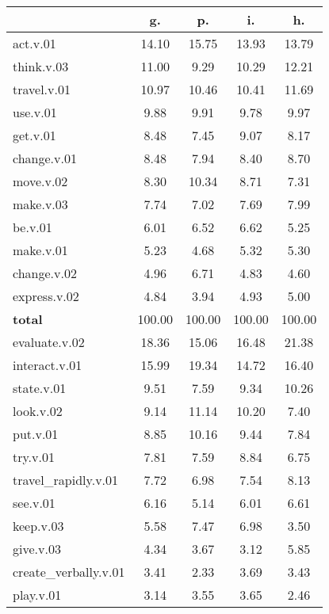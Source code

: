 \begin{table}[h!]
\begin{center}
\begin{tabular}{| l || c | c | c | c |}\hline
 & {\bf g.} & {\bf p.} & {\bf i.} & {\bf h.} \\\hline\hline
act.v.01 & 14.10  & 15.75  & 13.93  & 13.79 \\\hline
think.v.03 & 11.00  & 9.29  & 10.29  & 12.21 \\\hline
travel.v.01 & 10.97  & 10.46  & 10.41  & 11.69 \\\hline
use.v.01 & 9.88  & 9.91  & 9.78  & 9.97 \\\hline
get.v.01 & 8.48  & 7.45  & 9.07  & 8.17 \\\hline
change.v.01 & 8.48  & 7.94  & 8.40  & 8.70 \\\hline
move.v.02 & 8.30  & 10.34  & 8.71  & 7.31 \\\hline
make.v.03 & 7.74  & 7.02  & 7.69  & 7.99 \\\hline
be.v.01 & 6.01  & 6.52  & 6.62  & 5.25 \\\hline
make.v.01 & 5.23  & 4.68  & 5.32  & 5.30 \\\hline
change.v.02 & 4.96  & 6.71  & 4.83  & 4.60 \\\hline
express.v.02 & 4.84  & 3.94  & 4.93  & 5.00 \\\hline\hline
{{\bf total}} & 100.00  & 100.00  & 100.00  & 100.00 \\\hline\hline\hline
evaluate.v.02 & 18.36  & 15.06  & 16.48  & 21.38 \\\hline
interact.v.01 & 15.99  & 19.34  & 14.72  & 16.40 \\\hline
state.v.01 & 9.51  & 7.59  & 9.34  & 10.26 \\\hline
look.v.02 & 9.14  & 11.14  & 10.20  & 7.40 \\\hline
put.v.01 & 8.85  & 10.16  & 9.44  & 7.84 \\\hline
try.v.01 & 7.81  & 7.59  & 8.84  & 6.75 \\\hline
travel\_rapidly.v.01 & 7.72  & 6.98  & 7.54  & 8.13 \\\hline
see.v.01 & 6.16  & 5.14  & 6.01  & 6.61 \\\hline
keep.v.03 & 5.58  & 7.47  & 6.98  & 3.50 \\\hline
give.v.03 & 4.34  & 3.67  & 3.12  & 5.85 \\\hline
create\_verbally.v.01 & 3.41  & 2.33  & 3.69  & 3.43 \\\hline
play.v.01 & 3.14  & 3.55  & 3.65  & 2.46 \\\hline\hline

\end{tabular}
\end{center}
\end{table}
